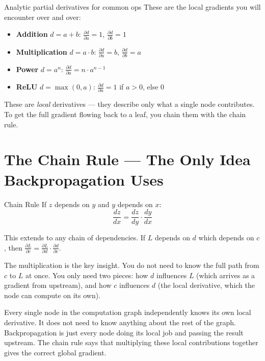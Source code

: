 \documentclass[12pt,a4paper]{article}
\begin{document}
\begin{patternbox}{Analytic partial derivatives for common ops}
These are the local gradients you will encounter over and over:
\begin{itemize}
  \item \textbf{Addition} $d = a + b$: $\frac{\partial d}{\partial a} = 1$, $\frac{\partial d}{\partial b} = 1$
  \item \textbf{Multiplication} $d = a \cdot b$: $\frac{\partial d}{\partial a} = b$, $\frac{\partial d}{\partial b} = a$
  \item \textbf{Power} $d = a^n$: $\frac{\partial d}{\partial a} = n \cdot a^{n-1}$
  \item \textbf{ReLU} $d = \max(0, a)$: $\frac{\partial d}{\partial a} = 1$ if $a > 0$, else $0$
\end{itemize}
These are \emph{local} derivatives — they describe only what a single node contributes. To get the full gradient flowing back to a leaf, you chain them with the chain rule.
\end{patternbox}

\section{The Chain Rule — The Only Idea Backpropagation Uses}

\begin{mathbox}{Chain Rule}
If $z$ depends on $y$ and $y$ depends on $x$:
\[
\frac{dz}{dx} = \frac{dz}{dy} \cdot \frac{dy}{dx}
\]
\end{mathbox}

This extends to any chain of dependencies. If $L$ depends on $d$ which depends on $c$, then $\frac{\partial L}{\partial c} = \frac{\partial L}{\partial d} \cdot \frac{\partial d}{\partial c}$.

The multiplication is the key insight. You do not need to know the full path from $c$ to $L$ at once. You only need two pieces: how $d$ influences $L$ (which arrives as a gradient from upstream), and how $c$ influences $d$ (the local derivative, which the node can compute on its own).

\begin{stickybox}
Every single node in the computation graph independently knows its own local derivative. It does not need to know anything about the rest of the graph. Backpropagation is just every node doing its local job and passing the result upstream. The chain rule says that multiplying these local contributions together gives the correct global gradient.
\end{stickybox}
\end{document}
